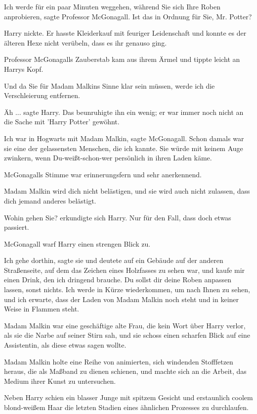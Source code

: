 \glqq{}Ich werde für ein paar Minuten weggehen, während Sie sich Ihre Roben
anprobieren\grqq{}, sagte Professor McGonagall. \glqq{}Ist das in Ordnung für
Sie, Mr. Potter?\grqq{}

Harry nickte. Er hasste Kleiderkauf mit feuriger Leidenschaft und konnte es der
älteren Hexe nicht verübeln, dass es ihr genauso ging.

Professor McGonagalls Zauberstab kam aus ihrem Ärmel und tippte leicht an Harrys
Kopf.

\glqq{}Und da Sie für Madam Malkins Sinne klar sein müssen, werde ich die
Verschleierung entfernen.\grqq{}

\glqq{}Äh ...\grqq{} sagte Harry. Das beunruhigte ihn ein wenig; er war immer
noch nicht an die Sache mit 'Harry Potter' gewöhnt.

\glqq{}Ich war in Hogwarts mit Madam Malkin\grqq{}, sagte McGonagall. \glqq{}Schon
damals war sie eine der gelassensten Menschen, die ich kannte. Sie würde mit
keinem Auge zwinkern, wenn Du-weißt-schon-wer persönlich in ihren Laden
käme.\grqq{}

McGonagalls Stimme war erinnerungsfern und sehr anerkennend.

\glqq{}Madam Malkin wird dich nicht belästigen, und sie wird auch nicht zulassen,
dass dich jemand anderes belästigt.\grqq{}

\glqq{}Wohin gehen Sie?\grqq{} erkundigte sich Harry. \glqq{}Nur für den Fall,
dass doch etwas passiert.\grqq{}

McGonagall warf Harry einen strengen Blick zu.

\glqq{}Ich gehe dorthin\grqq{}, sagte sie und deutete auf ein Gebäude auf der
anderen Straßenseite, auf dem das Zeichen eines Holzfasses zu sehen war, \glqq{}
und kaufe mir einen Drink, den ich dringend brauche. Du sollst dir deine Roben
anpassen lassen, sonst nichts. Ich werde in Kürze wiederkommen, um nach Ihnen zu
sehen, und ich erwarte, dass der Laden von Madam Malkin noch steht und in keiner
Weise in Flammen steht.\grqq{}

Madam Malkin war eine geschäftige alte Frau, die kein Wort über Harry verlor,
als sie die Narbe auf seiner Stirn sah, und sie schoss einen scharfen Blick auf
eine Assistentin, als diese etwas sagen wollte.

Madam Malkin holte eine Reihe von animierten, sich windenden Stofffetzen heraus,
die als Maßband zu dienen schienen, und machte sich an die Arbeit, das Medium
ihrer Kunst zu untersuchen.

Neben Harry schien ein blasser Junge mit spitzem Gesicht und erstaunlich coolem
blond-weißem Haar die letzten Stadien eines ähnlichen Prozesses zu durchlaufen.

